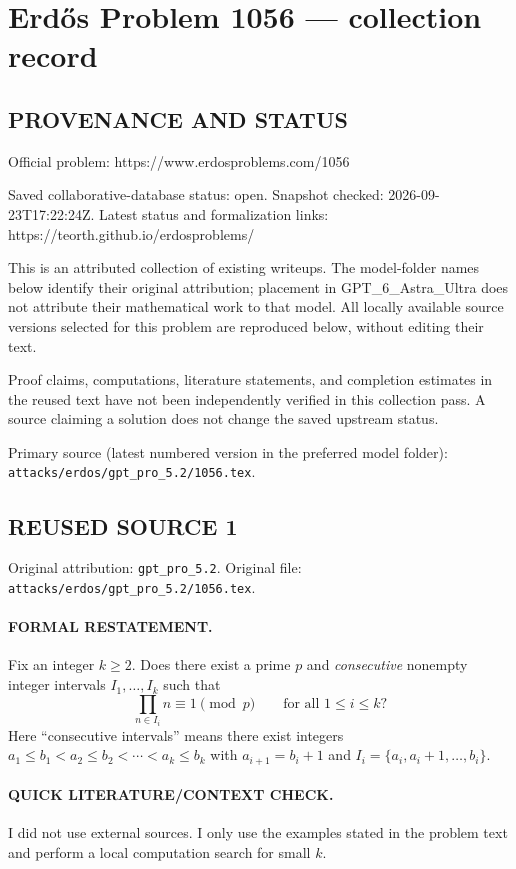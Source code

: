 \section*{Erd\H{o}s Problem 1056 --- collection record}

\subsection*{PROVENANCE AND STATUS}
Official problem: https://www.erdosproblems.com/1056

Saved collaborative-database status: open.
Snapshot checked: 2026-09-23T17:22:24Z.
Latest status and formalization links: https://teorth.github.io/erdosproblems/

This is an attributed collection of existing writeups. The model-folder names below identify their original attribution; placement in GPT\_6\_Astra\_Ultra does not attribute their mathematical work to that model. All locally available source versions selected for this problem are reproduced below, without editing their text.

Proof claims, computations, literature statements, and completion estimates in the reused text have not been independently verified in this collection pass. A source claiming a solution does not change the saved upstream status.

Primary source (latest numbered version in the preferred model folder): \texttt{attacks/erdos/gpt\_pro\_5.2/1056.tex}.

\subsection*{REUSED SOURCE 1}
Original attribution: \texttt{gpt\_pro\_5.2}.
Original file: \texttt{attacks/erdos/gpt\_pro\_5.2/1056.tex}.


\paragraph{FORMAL RESTATEMENT.}
Fix an integer $k\ge 2$.
Does there exist a prime $p$ and \emph{consecutive} nonempty integer intervals $I_1,\dots,I_k$ such that
\[
\prod_{n\in I_i} n \equiv 1 \pmod p\qquad\text{for all }1\le i\le k?
\]
Here “consecutive intervals” means there exist integers $a_1\le b_1 < a_2\le b_2 < \cdots < a_k\le b_k$ with $a_{i+1}=b_i+1$ and $I_i=\{a_i,a_i+1,\dots,b_i\}$.

\paragraph{QUICK LITERATURE/CONTEXT CHECK.}
I did not use external sources. I only use the examples stated in the problem text and perform a local computation search for small $k$.

